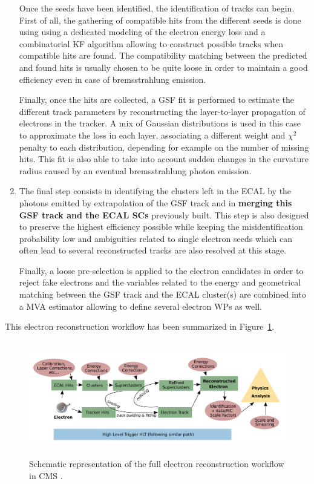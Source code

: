 \documentclass[a4paper, 10pt, openright]{report}
\begin{document}
\begin{enumerate}
Once the seeds have been identified, the identification of tracks can begin. First of all, the gathering of compatible hits from the different seeds is done using using a dedicated modeling of the electron energy loss and a combinatorial \ac{KF} algorithm allowing to construct possible tracks when compatible hits are found. The compatibility matching between the predicted and found hits is usually chosen to be quite loose in order to maintain a good efficiency even in case of bremsstrahlung emission.

Finally, once the hits are collected, a \ac{GSF} fit is performed to estimate the different track parameters by reconstructing the layer-to-layer propagation of electrons in the tracker. A mix of Gaussian distributions is used in this case to approximate the loss in each layer, associating a different weight and $\chi^2$ penalty to each distribution, depending for example on the number of missing hits. This fit is also able to take into account sudden changes in the curvature radius caused by an eventual bremsstrahlung photon emission.

\item The final step consists in identifying the clusters left in the \ac{ECAL} by the photons emitted by extrapolation of the \ac{GSF} track and in \textbf{merging this \ac{GSF} track and the \ac{ECAL} \acp{SC}} previously built. This step is also designed to preserve the highest efficiency possible while keeping the misidentification probability low and ambiguities related to single electron seeds which can often lead to several reconstructed tracks are also resolved at this stage.

Finally, a loose pre-selection is applied to the electron candidates in order to reject fake electrons and the variables related to the energy and geometrical matching between the \ac{GSF} track and the \ac{ECAL} cluster(s) are combined into a \acf{MVA} estimator allowing to define several electron \acp{WP} as well.
\end{enumerate}

This electron reconstruction workflow has been summarized in Figure~\ref{fig:EleWorkflow}.

\begin{figure}[htbp]
\begin{center}
\includegraphics[width=14cm, height=5cm]{figs/EleWorkflow.png}
\caption{Schematic representation of the full electron reconstruction workflow in \ac{CMS} \cite{EleWorkflow}.}
\label{fig:EleWorkflow}
\end{center}
\end{figure}
\end{document}
